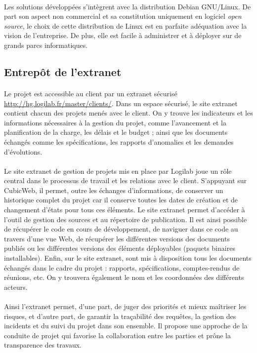 \documentclass {report}
\begin{document}
\paragraph{}
Les solutions développées s'intègrent avec la distribution Debian GNU/Linux. De part son aspect non commercial et sa constitution uniquement en logiciel \textit{open source}, le choix de cette distribution de Linux est en parfaite adéquation avec la vision de l'entreprise. De plus, elle est facile à administrer et à déployer sur de grands parcs informatiques.

\subsection{Entrepôt de l'extranet}
\paragraph{}
Le projet est accessible au client par un extranet sécurisé \url{http://hg.logilab.fr/master/clients/}.  Dans un espace sécurisé, le site extranet contient chacun des projets menés avec le client. On y trouve les indicateurs et les informations nécessaires à la gestion du projet, comme l’avancement et la planification de la charge, les délais et le budget ; ainsi que les documents échangés comme les spécifications, les rapports d’anomalies et les demandes d’évolutions.
\paragraph{}
Le site extranet de gestion de projets mis en place par Logilab joue un rôle central dans le processus de travail et les relations avec le client. S’appuyant sur CubicWeb, il permet, outre les échanges d’informations, de conserver un historique complet du projet car il conserve toutes les dates de création et de changement d’états pour tous ces éléments. Le site extranet permet d’accéder à l’outil de gestion des sources et au répertoire de publication. Il est ainsi possible de récupérer le code en cours de développement, de naviguer dans ce code au travers d’une vue Web, de récupérer les différentes versions des documents publiés ou les différentes versions des éléments déployables (paquets binaires installables). Enfin, sur le site extranet, sont mis à disposition tous les documents échangés dans le cadre du projet : rapports, spécifications, comptes-rendus de réunions, etc. On y trouvera également le nom et les coordonnées des différents acteurs.
\paragraph{}
Ainsi l'extranet permet, d'une part, de juger des priorités et mieux maîtriser les risques, et d'autre part, de garantir la traçabilité des requêtes, la gestion des incidents et du suivi du projet dans son ensemble. Il propose une approche de la conduite de projet qui favorise la collaboration entre les parties et prône la transparence des travaux.
\end{document}
